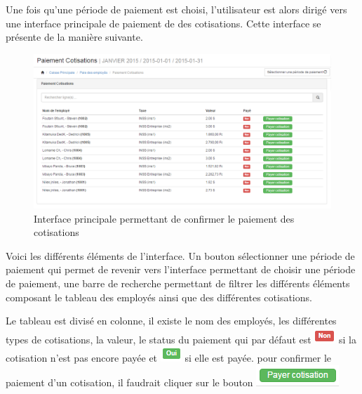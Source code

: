 \documentclass[12pt,a4paper]{report}
\begin{document}
Une fois qu'une période de paiement est choisi, l'utilisateur est alors dirigé vers une interface principale de paiement de des cotisations. Cette interface se présente de la manière suivante.

\begin{figure}[h]
\begin{center}
\includegraphics[width=14cm]{pic/PaiemCoInterface.png}
\end{center}
\caption{Interface principale permettant de confirmer le paiement des cotisations}
\label{Interface principale permettant de confirmer le paiement des cotisations}
\end{figure}

Voici les différents éléments de l'interface. Un bouton sélectionner une période de paiement qui permet de revenir vers l'interface permettant de choisir une période de paiement, une barre de recherche permettant de filtrer les différents éléments composant le tableau des employés ainsi que des différentes cotisations.

Le tableau est divisé en colonne, il existe le nom des employés, les différentes types de cotisations, la valeur, le status du paiement qui par défaut est \includegraphics[scale=0.7]{pic/NonTaxes.png} si la cotisation n'est pas encore payée et \includegraphics[scale=0.7]{pic/OuiTaxes.png} si elle est payée. pour confirmer le paiement d'un cotisation, il faudrait cliquer sur le bouton \includegraphics[scale=0.7]{pic/CotPayBouton.png}
\end{document}
